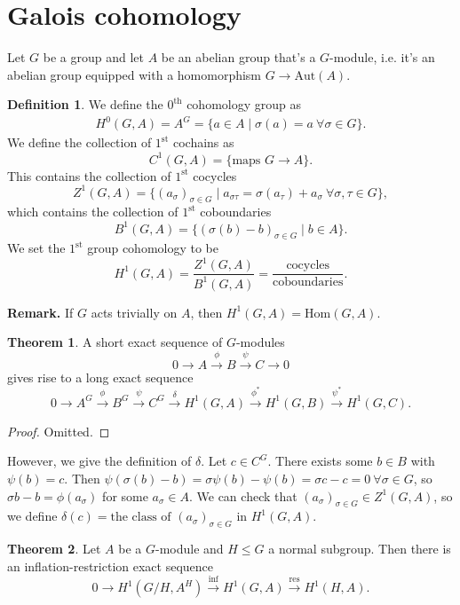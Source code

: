 \documentclass{article}
\theoremstyle{definition}
\newtheorem{theorem}{Theorem}[section]
\newtheorem{defn}{Definition}[section]
\begin{document}
\section{Galois cohomology}
Let $G$ be a group and let $A$ be an abelian group that's a $G$-module, i.e. it's an abelian group equipped with a homomorphism $G \to \text{Aut}(A)$.
\begin{defn}
    We define the $0^{\text{th}}$ cohomology group as
    \begin{align*}
        H^0(G,A) = A^G = \{a \in A\mid \sigma(a)=a ~\forall \sigma \in G\}.
    \end{align*}
    We define the collection of $1^{\text{st}}$ cochains as \[
    C^1(G,A) = \{\text{maps }G \to A\}.
    \]
    This contains the collection of $1^{\text{st}}$ cocycles
    \[
    Z^1(G,A) = \{(a_\sigma)_{\sigma \in G} \mid a_{\sigma \tau} = \sigma(a_\tau)+a_\sigma ~\forall \sigma, \tau \in G\},
    \]
    which contains the collection of $1^{\text{st}}$ coboundaries
    \[
    B^1(G,A) = \{(\sigma(b)-b)_{\sigma \in G} \mid b \in A\}.
    \]
    We set the $1^{\text{st}}$ group cohomology to be
    \[
    H^1(G,A) = \frac{Z^1(G,A)}{B^1(G,A)} = \frac{\text{cocycles}}{\text{coboundaries}}.
    \]
\end{defn}
\textbf{Remark.} If $G$ acts trivially on $A$, then $H^1(G,A)=\text{Hom}(G,A)$.
\begin{theorem}\label{theorem15.1}
    A short exact sequence of $G$-modules \[
    0 \to A \stackrel{\phi}{\to } B \stackrel{\psi}{\to} C \to 0
    \]
    gives rise to a long exact sequence 
    \[
    0 \to A^G \stackrel{\phi}{\to} B^G \stackrel{\psi}{\to} C^G \stackrel{\delta}{\to}  H^1(G,A) \stackrel{\phi^*}{\to} H^1(G,B) \stackrel{\psi^*}{\to} H^1(G,C).
    \]
\end{theorem}
\begin{proof}
    Omitted.
\end{proof}
However, we give the definition of $\delta$. Let $c \in C^G$. There exists some $b \in B$ with $\psi(b)=c$. Then $\psi(\sigma(b)-b)=\sigma \psi(b)-\psi(b) = \sigma c - c = 0 ~\forall \sigma \in G$, so $\sigma b - b = \phi(a_\sigma)$ for some $a_\sigma \in A$. We can check that $(a_\sigma)_{\sigma \in G} \in Z^1(G,A)$, so we define $\delta(c) = \text{the class of }(a_\sigma)_{\sigma \in G}$ in $H^1(G,A)$.
\begin{theorem}\label{theorem15.2}
    Let $A$ be a $G$-module and $H \le G$ a normal subgroup. Then there is an inflation-restriction exact sequence 
    \[
    0 \to H^1(G/H,A^H) \stackrel{\text{inf}}{\to} H^1(G,A) \stackrel{\text{res}}{\to} H^1(H,A).
    \]
\end{theorem}
\end{document}
